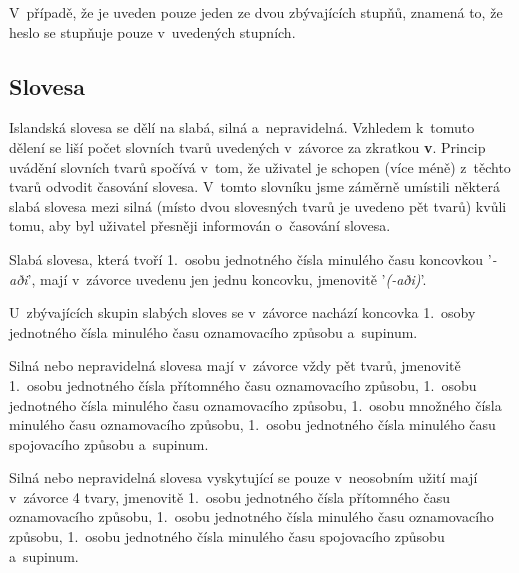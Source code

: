 V~případě, že je uveden pouze jeden ze dvou zbývajících stupňů, znamená to, že heslo se stupňuje pouze v~uvedených stupních.

\blspace
  \dicEntry {}  
\blspace

\subsection*{Slovesa}

Islandská slovesa se dělí na slabá, silná a~nepravidelná. Vzhledem k~tomuto dělení se liší počet slovních tvarů uvedených v~závorce za zkratkou \textbf{v}. Princip uvádění slovních tvarů spočívá v~tom, že uživatel
je schopen (více méně) z~těchto tvarů odvodit časování slovesa. V~tomto slovníku jsme
záměrně umístili některá slabá slovesa mezi silná (místo dvou slovesných tvarů je uvedeno pět tvarů) kvůli tomu, aby byl uživatel přesněji informován o~časování slovesa.

Slabá slovesa, která tvoří 1.~osobu jednotného čísla minulého času koncovkou '\textit{-aði}', mají v~závorce uvedenu jen jednu koncovku, jmenovitě '\textit{(-aði)}'.

\blspace
  \dicEntry {}  
\blspace

U~zbývajících skupin slabých sloves se v~závorce nachází koncovka 1.~osoby jednotného čísla minulého času oznamovacího způsobu a~supinum.

\blspace
  \dicEntry {}  
\blspace

Silná nebo nepravidelná slovesa mají v~závorce vždy pět tvarů, jmenovitě 1.~osobu jednotného čísla přítomného času oznamovacího způsobu, 1.~osobu jednotného čísla minulého času oznamovacího způsobu, 1.~osobu množného čísla minulého času oznamovacího způsobu, 1.~osobu jednotného čísla minulého času spojovacího způsobu a~supinum.

\blspace
  \dicEntry {}  
\blspace

Silná nebo nepravidelná slovesa vyskytující se pouze v~neosobním užití mají v~závorce 4 tvary, jmenovitě 1.~osobu jednotného čísla přítomného času oznamovacího způsobu, 1.~osobu jednotného čísla minulého času oznamovacího způsobu, 1.~osobu jednotného čísla minulého času spojovacího způsobu a~supinum.

\blspace
  \dicEntry {}  
\blspace

